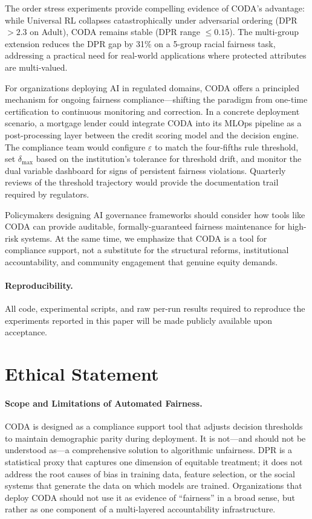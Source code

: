 \documentclass[letterpaper]{article} %
\theoremstyle{definition}
\begin{document}
The order stress experiments provide compelling evidence of CODA's advantage: while Universal RL collapses catastrophically under adversarial ordering (DPR $> 2.3$ on Adult), CODA remains stable (DPR range $\leq 0.15$). The multi-group extension reduces the DPR gap by 31\% on a 5-group racial fairness task, addressing a practical need for real-world applications where protected attributes are multi-valued.

For organizations deploying AI in regulated domains, CODA offers a principled mechanism for ongoing fairness compliance---shifting the paradigm from one-time certification to continuous monitoring and correction. In a concrete deployment scenario, a mortgage lender could integrate CODA into its MLOps pipeline as a post-processing layer between the credit scoring model and the decision engine. The compliance team would configure $\varepsilon$ to match the four-fifths rule threshold, set $\delta_{\max}$ based on the institution's tolerance for threshold drift, and monitor the dual variable dashboard for signs of persistent fairness violations. Quarterly reviews of the threshold trajectory would provide the documentation trail required by regulators.

Policymakers designing AI governance frameworks should consider how tools like CODA can provide auditable, formally-guaranteed fairness maintenance for high-risk systems. At the same time, we emphasize that CODA is a tool for compliance support, not a substitute for the structural reforms, institutional accountability, and community engagement that genuine equity demands.

\paragraph{Reproducibility.} All code, experimental scripts, and raw per-run results required to reproduce the experiments reported in this paper will be made publicly available upon acceptance.

\section*{Ethical Statement}

\paragraph{Scope and Limitations of Automated Fairness.}
CODA is designed as a compliance support tool that adjusts decision thresholds to maintain demographic parity during deployment. It is not---and should not be understood as---a comprehensive solution to algorithmic unfairness. DPR is a statistical proxy that captures one dimension of equitable treatment; it does not address the root causes of bias in training data, feature selection, or the social systems that generate the data on which models are trained. Organizations that deploy CODA should not use it as evidence of ``fairness'' in a broad sense, but rather as one component of a multi-layered accountability infrastructure.
\end{document}
